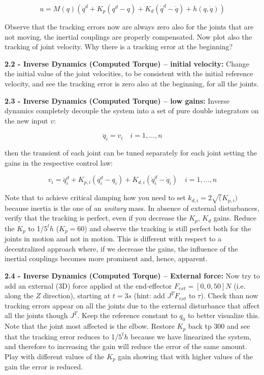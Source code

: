 \documentclass[11pt]{article}
\begin{document}
\begin{equation*}
u = M(q) (\ddot{q}^d + K_{p} (q^d  - q) + K_{d} (\dot{q}^d  - \dot{q}) + h(q,\dot{q}))
\end{equation*}

Observe that the tracking errors  now are  always zero also for the joints that are not moving, 
the inertial couplings are properly compensated. 
Now plot also the tracking of joint velocity. Why there is a tracking error at the beginning? 

\quad

\noindent
\textbf{ 2.2 - Inverse Dynamics (Computed Torque) – initial velocity:}
Change the initial value of the joint velocities, to be consistent with the initial reference velocity, and see the tracking error is zero also at the beginning, for all the joints. 

\quad

\noindent
\textbf{ 2.3 - Inverse Dynamics (Computed Torque) – low gains:}
Inverse dynamics completely decouple the system into a set of pure double integrators on the new input $v$:

\begin{equation*}
\ddot{q}_i = v_i  \quad i = 1, \dots, n
\end{equation*}

then the transient of each joint can be tuned separately for each joint setting the gains in the respective  control law:

\begin{equation*}
v_i  = \ddot{q}^d_i + K_{p,i} (q^d_i  - q_i) + K_{d,i} (\dot{q}^d_i  - \dot{q}_i) \quad i = 1, \dots, n
\end{equation*}

Note that to achieve critical damping how you need to set $k_{d,i} = 2\sqrt(K_{p,i})$ because inertia is the one of an \textit{unitary} mass.
In absence of external disturbances, verify that the tracking is perfect, 
even if you decrease the $K_p$, $K_d$ gains.  Reduce the $K_p$ to 1/$5^th$ ($K_p = 60$) and observe the tracking is still perfect both for the joints in motion and not in motion. This is different with respect to a decentralized approach where, if we decrease the gains,  the influence of the inertial couplings becomes more  prominent and, hence, apparent.   

\quad

\noindent
\textbf{2.4 - Inverse Dynamics (Computed Torque) – External force:} 
Now try to add an external (3D) force applied at the end-effector $F_{ext} =[0,0,50] N$ (i.e. along the $Z$ direction),
starting at $t= 3s$ (hint: add  $J^TF_{ext}$ to $\tau$). Check than now tracking errors appear on all the joints due to the external disturbance that affect all the joints though  $J^T$. Keep the  reference  constant to $q_0$ to better visualize this. Note that the joint most affected is the elbow.
Restore $K_p$ back tp $300$ and see that the tracking error reduces to 1/$5^th$ because we have linearized the system, and therefore to increasing the gain will reduce the error of the same amount. 
Play with different values of the  $K_p$ gain showing that with higher values of the gain the error is reduced.
\end{document}
